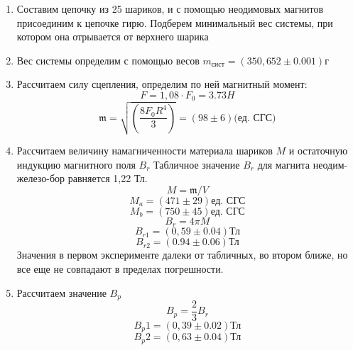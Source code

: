 \documentclass[12pt,a4paper]{article}
\begin{document}
\begin{enumerate}
    \item Составим цепочку из 25 шариков, и с помощью неодимовых магнитов присоединим к цепочке гирю. Подберем минимальный вес системы, при котором она отрывается от верхнего шарика
    \item Вес системы определим с помощью весов $m_{\text{сист}} = (350,652 \pm 0.001) \text{г}$
    \item Рассчитаем силу сцепления, определим по ней магнитный момент: 
    \begin{equation}
        F = 1,08 \cdot F_0 = 3.73 H 
    \end{equation}
    \begin{equation}
        \mathfrak{m} = \sqrt{\left(\frac{8F_0R^4}{3}\right)} = (98 \pm 6) \text{(ед. СГС)}
    \end{equation}
    \item Рассчитаем величину намагниченности материала шариков $M$ и остаточную индукцию магнитного поля $B_r$ Табличное значение $B_r$ для магнита неодим-железо-бор равняется 1,22 Тл. 
    \begin{equation}
        M = \mathfrak{m} / V 
    \end{equation}
    \begin{equation}
        M_a = (471 \pm 29) \text{ед. СГС}
    \end{equation}
    \begin{equation}
        M_b = (750  \pm 45) \text{ед. СГС}
    \end{equation}
    \begin{equation}
        B_r = 4\pi M
    \end{equation}
    \begin{equation}
        B_{r1}  = (0,59 \pm 0.04) \text{Тл}
    \end{equation}
    \begin{equation}
        B_{r2} = (0.94 \pm 0.06) \text{Тл}
    \end{equation}
    Значения в первом эксперименте далеки от табличных, во втором ближе, но все еще не совпадают в пределах погрешности. 
    \item Рассчитаем значение $B_p$
    \begin{equation}
        B_p = \frac{2}{3}B_r
    \end{equation}
    \begin{equation}
        B_p1 = (0,39 \pm 0.02) \text{Тл}
    \end{equation}
    \begin{equation}
        B_p2 = (0,63 \pm 0.04) \text{Тл}
    \end{equation}
\end{enumerate}
\end{document}
